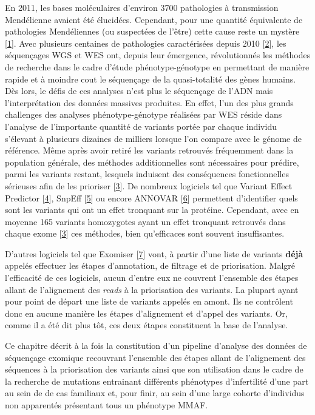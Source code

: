 \documentclass[12pt,twoside]{ugathesis}
\begin{document}
En 2011, les bases moléculaires d'environ 3700 pathologies à
transmission Mendélienne avaient été élucidées. Cependant, pour une
quantité équivalente de pathologies Mendéliennes (ou suspectées de
l'être) cette cause reste un mystère
{[}\protect\hyperlink{ref-Amberger2011}{1}{]}. Avec plusieurs centaines
de pathologies caractérisées depuis 2010
{[}\protect\hyperlink{ref-Ng}{2}{]}, les séquençages WGS et WES ont,
depuis leur émergence, révolutionnés les méthodes de recherche dans le
cadre d'étude phénotype-génotype en permettant de manière rapide et à
moindre cout le séquençage de la quasi-totalité des gènes humains. Dès
lors, le défis de ces analyses n'est plus le séquençage de l'ADN mais
l'interprétation des données massives produites. En effet, l'un des plus
grands challenges des analyses phénotype-génotype réalisées par WES
réside dans l'analyse de l'importante quantité de variants portée par
chaque individu s'élevant à plusieurs dizaines de milliers lorsque l'on
compare avec le génome de référence. Même après avoir retiré les
variants retrouvés fréquemment dans la population générale, des méthodes
additionnelles sont nécessaires pour prédire, parmi les variants
restant, lesquels induisent des conséquences fonctionnelles sérieuses
afin de les prioriser {[}\protect\hyperlink{ref-Pelak2010}{3}{]}. De
nombreux logiciels tel que Variant Effect Predictor
{[}\protect\hyperlink{ref-McLaren2016}{4}{]}, SnpEff
{[}\protect\hyperlink{ref-Cingolani2012}{5}{]} ou encore ANNOVAR
{[}\protect\hyperlink{ref-Wang2010}{6}{]} permettent d'identifier quels
sont les variants qui ont un effet tronquant sur la protéine. Cependant,
avec en moyenne 165 variants homozygotes ayant un effet tronquant
retrouvés dans chaque exome {[}\protect\hyperlink{ref-Pelak2010}{3}{]}
ces méthodes, bien qu'efficaces sont souvent insuffisantes.

D'autres logiciels tel que Exomiser
{[}\protect\hyperlink{ref-Robinson2014}{7}{]} vont, à partir d'une liste
de variants \textbf{déjà} appelés effectuer les étapes d'annotation, de
filtrage et de priorisation. Malgré l'efficacité de ces logiciels, aucun
d'entre eux ne couvrent l'ensemble des étapes allant de l'alignement des
\emph{reads} à la priorisation des variants. La plupart ayant pour point
de départ une liste de variants appelés en amont. Ils ne contrôlent donc
en aucune manière les étapes d'alignement et d'appel des variants. Or,
comme il a été dit plus tôt, ces deux étapes constituent la base de
l'analyse.

Ce chapitre décrit à la fois la constitution d'un pipeline d'analyse des
données de séquençage exomique recouvrant l'ensemble des étapes allant
de l'alignement des séquences à la priorisation des variants ainsi que
son utilisation dans le cadre de la recherche de mutations entrainant
différents phénotypes d'infertilité d'une part au sein de de cas
familiaux et, pour finir, au sein d'une large cohorte d'individus non
apparentés présentant tous un phénotype MMAF.
\end{document}
